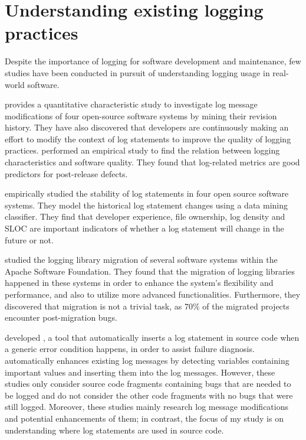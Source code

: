 \section{Understanding existing logging practices}  \label{understand-logging}

Despite the importance of logging for software development and maintenance, few studies have been conducted in pursuit of understanding logging usage in real-world software.

\citet{yuan2012characterizing} provides a quantitative characteristic study to investigate log message modifications of four open-source software systems by mining their revision history.  They have also discovered that developers are continuously making an effort to modify the context of log statements to improve the quality of logging practices. \citet{shang2015studying} performed an empirical study to find the relation between logging characteristics and software quality. They found that log-related metrics are good predictors for post-release defects.

\citet{kabinna2016examining} empirically studied the stability of log statements in four open source software systems. They model the historical log statement changes using a data mining classifier. They find that developer experience, file ownership, log density and SLOC are important indicators of whether a log statement will change in the future or not.

\citet{kabinna2016logging} studied the logging library migration of several software systems within the Apache Software Foundation\@. They found that the migration of logging libraries happened in these systems in order to enhance the system's flexibility and performance, and also to utilize more advanced functionalities. Furthermore, they discovered that migration is not a trivial task, as 70\% of the migrated projects encounter post-migration bugs.

\citet{yuan2012conservative} developed , a tool that automatically inserts a log statement in source code when a generic error condition happens, in order to assist failure diagnosis.  \cite{yuan2012improving} automatically enhances existing log messages by detecting variables containing important values and inserting them into the log messages. However, these studies only consider source code fragments containing bugs that are needed to be logged and do not consider the other code fragments with no bugs that were still logged. Moreover, these studies mainly research log message modifications and potential enhancements of them; in contrast, the focus of my study is on understanding where log statements are used in source code.

